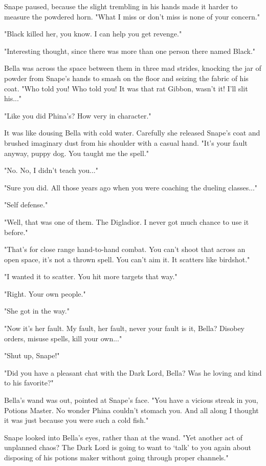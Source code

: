 Snape paused, because the slight trembling in his hands made it harder to measure the powdered horn. "What I miss or don't miss is none of your concern."

"Black killed her, you know. I can help you get revenge."

"Interesting thought, since there was more than one person there named Black."

Bella was across the space between them in three mad strides, knocking the jar of powder from Snape's hands to smash on the floor and seizing the fabric of his coat. "Who told you! Who told you! It was that rat Gibbon, wasn't it! I'll slit his..."

"Like you did Phina's? How very in character."

It was like dousing Bella with cold water. Carefully she released Snape's coat and brushed imaginary dust from his shoulder with a casual hand. "It's your fault anyway, puppy dog. You taught me the spell."

"No. No, I didn't teach you..."

"Sure you did. All those years ago when you were coaching the dueling classes..."

"Self defense."

"Well, that was one of them. The Digladior. I never got much chance to use it before."

"That's for close range hand-to-hand combat. You can't shoot that across an open space, it's not a thrown spell. You can't aim it. It scatters like birdshot."

"I wanted it to scatter. You hit more targets that way."

"Right. Your own people."

"She got in the way."

"Now it's her fault. My fault, her fault, never your fault is it, Bella? Disobey orders, misuse spells, kill your own..."

"Shut up, Snape!"

"Did you have a pleasant chat with the Dark Lord, Bella? Was he loving and kind to his favorite?"

Bella's wand was out, pointed at Snape's face. "You have a vicious streak in you, Potions Master. No wonder Phina couldn't stomach you. And all along I thought it was just because you were such a cold fish."

Snape looked into Bella's eyes, rather than at the wand. "Yet another act of unplanned chaos? The Dark Lord is going to want to `talk' to you again about disposing of his potions maker without going through proper channels."

